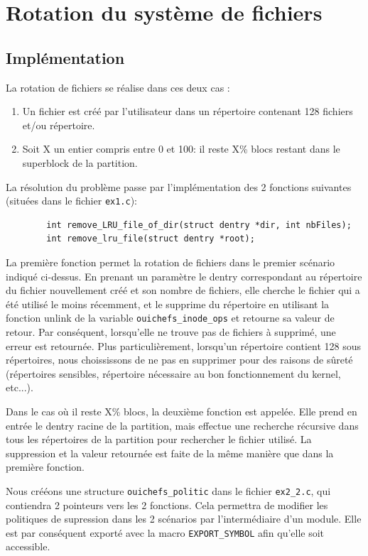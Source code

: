 \documentclass{article}
\begin{document}
	\section{Rotation du système de fichiers}
	\subsection{Implémentation}

    La rotation de fichiers se réalise dans ces deux cas :
	\begin{enumerate}
        \item Un fichier est créé par l'utilisateur dans un répertoire contenant 128 fichiers et/ou répertoire.
        \item Soit X un entier compris entre 0 et 100: il reste X\% blocs restant dans le superblock de la partition.
        \newline
    \end{enumerate}
    La résolution du problème passe par l'implémentation des 2 fonctions suivantes (situées dans le fichier \verb|ex1.c|):
	\begin{lstlisting}
		int remove_LRU_file_of_dir(struct dentry *dir, int nbFiles);
		int remove_lru_file(struct dentry *root);
	\end{lstlisting}
	
	La première fonction permet la rotation de fichiers dans le premier scénario indiqué ci-dessus. En prenant un paramètre le dentry correspondant au répertoire du fichier nouvellement créé et son nombre de fichiers, elle cherche le fichier qui a été utilisé le moins récemment, et le supprime du répertoire en utilisant la fonction unlink de la variable \verb|ouichefs_inode_ops| et retourne sa valeur de retour. Par conséquent, lorsqu'elle ne trouve pas de fichiers à supprimé, une erreur est retournée. Plus particulièrement, lorsqu'un répertoire contient 128 sous répertoires, nous choississons de ne pas en supprimer pour des raisons de sûreté (répertoires sensibles, répertoire nécessaire au bon fonctionnement du kernel, etc...).
	
	\newline
	Dans le cas où il reste X\% blocs, la deuxième fonction est appelée. Elle prend en entrée le dentry racine de la partition, mais effectue une recherche récursive dans tous les répertoires de la partition pour rechercher le fichier utilisé. La suppression et la valeur retournée est faite de la même manière que dans la première fonction.
	
	\newline
	Nous crééons une structure \verb|ouichefs_politic| dans le fichier \verb|ex2_2.c|, qui contiendra 2 pointeurs vers les 2 fonctions. Cela permettra de modifier les politiques de supression dans les 2 scénarios par l'intermédiaire d'un module. Elle est par conséquent exporté avec la macro \verb|EXPORT_SYMBOL| afin qu'elle soit accessible.
\end{document}

